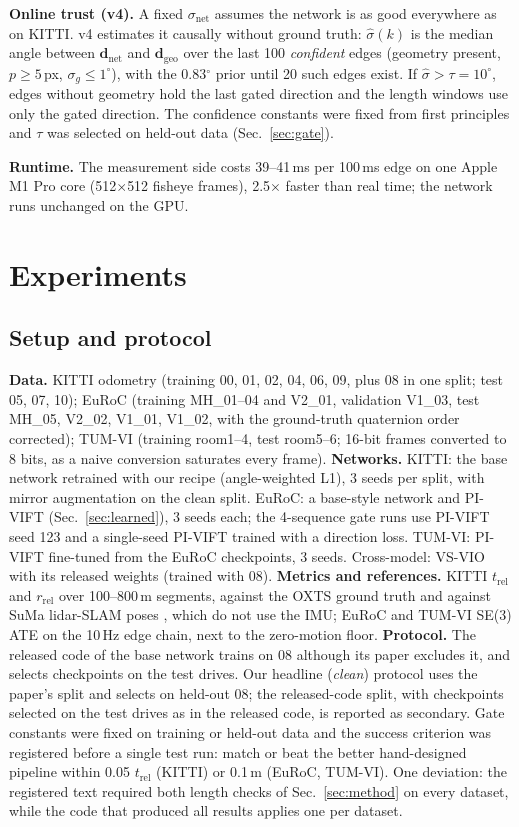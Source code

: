 \documentclass[letterpaper,journal]{IEEEtran}
\newcommand{\dnet}{\mathbf{d}_{\mathrm{net}}}
\newcommand{\dgeo}{\mathbf{d}_{\mathrm{geo}}}
\begin{document}
\textbf{Online trust (v4).} A fixed $\sigma_{\mathrm{net}}$ assumes the network is as good everywhere as on KITTI. v4 estimates it causally without ground truth: $\hat\sigma(k)$ is the median angle between $\dnet$ and $\dgeo$ over the last 100 \emph{confident} edges (geometry present, $p\ge5$\,px, $\sigma_g\le1^\circ$), with the 0.83$^\circ$ prior until 20 such edges exist. If $\hat\sigma>\tau=10^\circ$, edges without geometry hold the last gated direction and the length windows use only the gated direction. The confidence constants were fixed from first principles and $\tau$ was selected on held-out data (Sec.~\ref{sec:gate}).

\textbf{Runtime.} The measurement side costs 39--41\,ms per 100\,ms edge on one Apple M1 Pro core (512$\times$512 fisheye frames), 2.5$\times$ faster than real time; the network runs unchanged on the GPU.

\section{Experiments}

\subsection{Setup and protocol}
\textbf{Data.} KITTI odometry \cite{Geiger2012} (training 00, 01, 02, 04, 06, 09, plus 08 in one split; test 05, 07, 10); EuRoC \cite{Burri2016} (training MH\_01--04 and V2\_01, validation V1\_03, test MH\_05, V2\_02, V1\_01, V1\_02, with the ground-truth quaternion order corrected); TUM-VI \cite{Schubert2018} (training room1--4, test room5--6; 16-bit frames converted to 8 bits, as a naive conversion saturates every frame).
\textbf{Networks.} KITTI: the base network retrained with our recipe (angle-weighted L1), 3 seeds per split, with mirror augmentation on the clean split. EuRoC: a base-style network and PI-VIFT (Sec.~\ref{sec:learned}), 3 seeds each; the 4-sequence gate runs use PI-VIFT seed 123 and a single-seed PI-VIFT trained with a direction loss. TUM-VI: PI-VIFT fine-tuned from the EuRoC checkpoints, 3 seeds. Cross-model: VS-VIO \cite{Yang2022} with its released weights (trained with 08).
\textbf{Metrics and references.} KITTI $t_\mathrm{rel}$ and $r_\mathrm{rel}$ over 100--800\,m segments, against the OXTS ground truth and against SuMa lidar-SLAM poses \cite{Behley2018}, which do not use the IMU; EuRoC and TUM-VI SE(3) ATE on the 10\,Hz edge chain, next to the zero-motion floor.
\textbf{Protocol.} The released code of the base network trains on 08 although its paper excludes it, and selects checkpoints on the test drives. Our headline (\emph{clean}) protocol uses the paper's split and selects on held-out 08; the released-code split, with checkpoints selected on the test drives as in the released code, is reported as secondary. Gate constants were fixed on training or held-out data and the success criterion was registered before a single test run: match or beat the better hand-designed pipeline within 0.05 $t_\mathrm{rel}$ (KITTI) or 0.1\,m (EuRoC, TUM-VI). One deviation: the registered text required both length checks of Sec.~\ref{sec:method} on every dataset, while the code that produced all results applies one per dataset.
\end{document}
